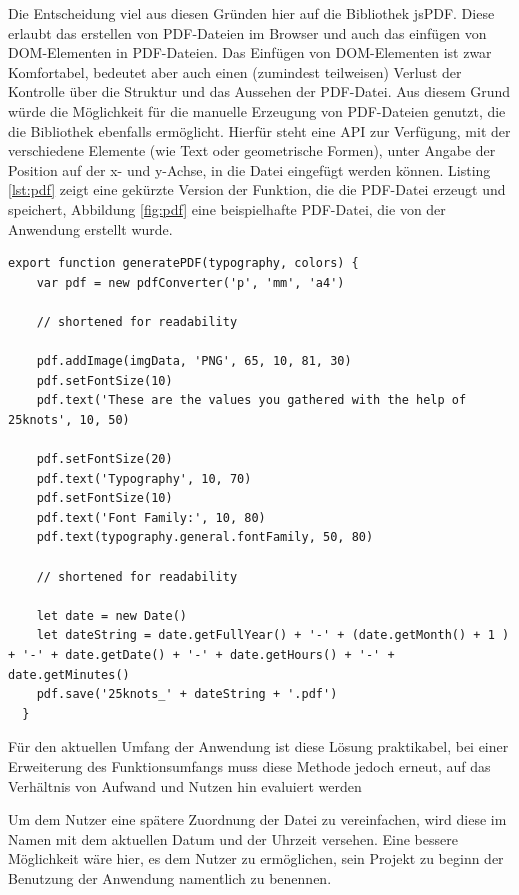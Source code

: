 
Die Entscheidung viel aus diesen Gründen hier auf die Bibliothek jsPDF\footnotemark{}. Diese erlaubt das erstellen von PDF-Dateien im Browser und auch das einfügen von DOM-Elementen in PDF-Dateien.
Das Einfügen von DOM-Elementen ist zwar Komfortabel, bedeutet aber auch einen (zumindest teilweisen) Verlust der Kontrolle über die Struktur und das Aussehen der PDF-Datei.
Aus diesem Grund würde die Möglichkeit für die manuelle Erzeugung von PDF-Dateien genutzt, die die Bibliothek ebenfalls ermöglicht. Hierfür steht eine API zur Verfügung, mit der verschiedene Elemente (wie Text oder geometrische Formen), unter Angabe der Position auf der x- und y-Achse, in die Datei eingefügt werden können. Listing \ref{lst:pdf} zeigt eine gekürzte Version der Funktion, die die PDF-Datei erzeugt und speichert, Abbildung \ref{fig:pdf} eine beispielhafte PDF-Datei, die von der Anwendung erstellt wurde.

\begin{lstlisting}[caption={Beispilehafte Generierung einer PDF-Datei}, label=lst:pdf]
  export function generatePDF(typography, colors) {
    var pdf = new pdfConverter('p', 'mm', 'a4')

    // shortened for readability

    pdf.addImage(imgData, 'PNG', 65, 10, 81, 30)
    pdf.setFontSize(10)
    pdf.text('These are the values you gathered with the help of 25knots', 10, 50)

    pdf.setFontSize(20)
    pdf.text('Typography', 10, 70)
    pdf.setFontSize(10)
    pdf.text('Font Family:', 10, 80)
    pdf.text(typography.general.fontFamily, 50, 80)

    // shortened for readability

    let date = new Date()
    let dateString = date.getFullYear() + '-' + (date.getMonth() + 1 ) + '-' + date.getDate() + '-' + date.getHours() + '-' + date.getMinutes()
    pdf.save('25knots_' + dateString + '.pdf')
  }
\end{lstlisting}


Für den aktuellen Umfang der Anwendung ist diese Lösung praktikabel, bei einer Erweiterung des Funktionsumfangs muss diese Methode jedoch erneut, auf das Verhältnis von Aufwand und Nutzen hin evaluiert werden

Um dem Nutzer eine spätere Zuordnung der Datei zu vereinfachen, wird diese im Namen mit dem aktuellen Datum und der Uhrzeit versehen. Eine bessere Möglichkeit wäre hier, es dem Nutzer zu ermöglichen, sein Projekt zu beginn der Benutzung der Anwendung namentlich zu benennen.


